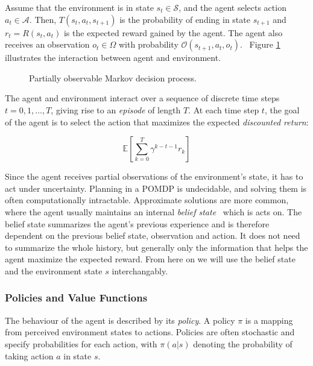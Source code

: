 Assume that the environment is in state \(s_t \in \mathcal{S}\), and the agent selects action \(a_t \in \mathcal{A}\).
Then, \(T(s_t, a_t, s_{t+1})\) is the probability of ending in state \(s_{t+1}\) and \(r_t = R(s_t, a_t)\) is the expected reward gained by the agent.
The agent also receives an observation \(o_t \in \Omega\) with probability \(\mathcal{O}(s_{t+1}, a_t, o_t)\).~\cite{kaelbling_pomdp_1998}
Figure \ref{fig:pomdp} illustrates the interaction between agent and environment.

\begin{figure}
    \centering
    
    \label{fig:pomdp}
    \caption[Partially observable Markov decision process]{Partially observable Markov decision process.}
\end{figure}

The agent and environment interact over a sequence of discrete time steps \(t = 0, 1, \dots, T\), giving rise to an \textit{episode} of length \(T\).
At each time step \(t\), the goal of the agent is to select the action that maximizes the expected \textit{discounted return}:

\[ 
    \mathbb{E} \left[ \sum_{k=0}^T \gamma^{k-t-1} r_k \right]
\]

Since the agent receives partial observations of the environment's state, it has to act under uncertainty.
Planning in a POMDP is undecidable, and solving them is often computationally intractable.
Approximate solutions are more common, where the agent usually maintains an internal \textit{belief state}~\cite{kaelbling_pomdp_1998} which is acts on.
The belief state summarizes the agent's previous experience and is therefore dependent on the previous belief state, observation and action.
It does not need to summarize the whole history, but generally only the information that helps the agent maximize the expected reward.
From here on we will use the belief state and the environment state \(s\) interchangably. 

\subsubsection{Policies and Value Functions}
\label{sec:policies-values}

The behaviour of the agent is described by its \textit{policy}.
A policy \(\pi\) is a mapping from perceived environment states to actions.
Policies are often stochastic and specify probabilities for each action, with \(\pi(a|s)\) denoting the probability of taking action \(a\) in state \(s\).~\cite{sutton_reinforcement_2018}

